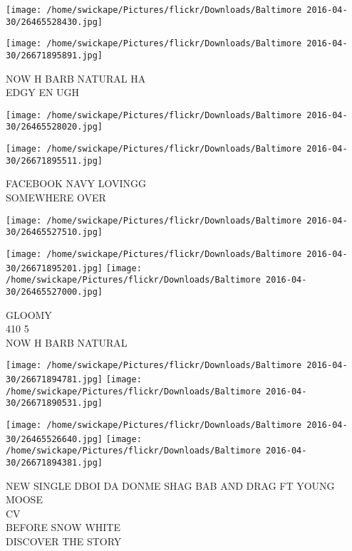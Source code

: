 \documentclass[10pt,letterpaper]{article}
\begin{document}
\texttt{[image: /home/swickape/Pictures/flickr/Downloads/Baltimore 2016-04-30/26465528430.jpg]}

\vspace{0.25in}
\texttt{[image: /home/swickape/Pictures/flickr/Downloads/Baltimore 2016-04-30/26671895891.jpg]}

NOW H BARB NATURAL HA\\
EDGY EN UGH\\
\pagebreak

\texttt{[image: /home/swickape/Pictures/flickr/Downloads/Baltimore 2016-04-30/26465528020.jpg]}

\vspace{0.25in}
\texttt{[image: /home/swickape/Pictures/flickr/Downloads/Baltimore 2016-04-30/26671895511.jpg]}

FACEBOOK NAVY LOVINGG\\
SOMEWHERE OVER\\
\pagebreak

\texttt{[image: /home/swickape/Pictures/flickr/Downloads/Baltimore 2016-04-30/26465527510.jpg]}

\vspace{0.25in}
\texttt{[image: /home/swickape/Pictures/flickr/Downloads/Baltimore 2016-04-30/26671895201.jpg]}
\texttt{[image: /home/swickape/Pictures/flickr/Downloads/Baltimore 2016-04-30/26465527000.jpg]}

GLOOMY\\
410 5\\
NOW H BARB NATURAL\\
\pagebreak

\texttt{[image: /home/swickape/Pictures/flickr/Downloads/Baltimore 2016-04-30/26671894781.jpg]}
\texttt{[image: /home/swickape/Pictures/flickr/Downloads/Baltimore 2016-04-30/26671890531.jpg]}

\texttt{[image: /home/swickape/Pictures/flickr/Downloads/Baltimore 2016-04-30/26465526640.jpg]}
\texttt{[image: /home/swickape/Pictures/flickr/Downloads/Baltimore 2016-04-30/26671894381.jpg]}

NEW SINGLE DBOI DA DONME SHAG BAB AND DRAG FT YOUNG MOOSE\\
CV\\
BEFORE SNOW WHITE\\
DISCOVER THE STORY\\
\pagebreak
\end{document}
